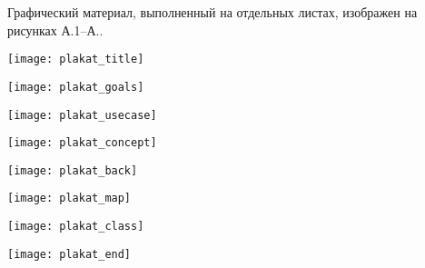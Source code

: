 
Графический материал, выполненный на отдельных листах,
изображен на рисунках А.1--А..
\setcounter{числоПлакатов}{0}

\renewcommand{\thefigure}{А.\arabic{figure}} %

\begin{landscape}

\begin{плакат}
    \texttt{[image: plakat\_title]}
    \label{pl1:image}      
\end{плакат}

\begin{плакат}
    \texttt{[image: plakat\_goals]}
    \label{pl2:image}      
\end{плакат}

\begin{плакат}
    \texttt{[image: plakat\_usecase]}
    \label{pl3:image}      
\end{плакат}

\begin{плакат}
    \texttt{[image: plakat\_concept]}
    \label{pl4:image}      
\end{плакат}

\begin{плакат}
	\texttt{[image: plakat\_back]}
	\label{pl5:image}      
\end{плакат}

\begin{плакат}
	\texttt{[image: plakat\_map]}
	\label{pl6:image}      
\end{плакат}

\begin{плакат}
	\texttt{[image: plakat\_class]}
	\label{pl7:image}      
\end{плакат}

\begin{плакат}
	\texttt{[image: plakat\_end]}
\label{pl8:image}      
\end{плакат}


\end{landscape}
